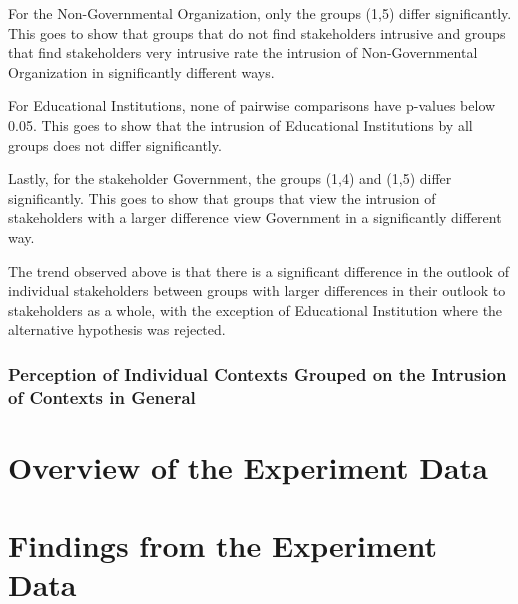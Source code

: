 For the Non-Governmental Organization, only the groups (1,5) differ significantly. This goes to show that groups that do not find stakeholders intrusive and groups that find stakeholders very intrusive rate the intrusion of Non-Governmental Organization in significantly different ways.

For Educational Institutions, none of pairwise comparisons have p-values below 0.05. This goes to show that the intrusion of Educational Institutions by all groups does not differ significantly.

Lastly, for the stakeholder Government, the groups (1,4) and (1,5) differ significantly. This goes to show that groups that view the intrusion of stakeholders with a larger difference view Government in a significantly different way.

The trend observed above is that there is a significant difference in the outlook of individual stakeholders between groups with larger differences
in their outlook to stakeholders as a whole, with the exception of Educational Institution where the alternative hypothesis was rejected.


\subsubsection{Perception of Individual Contexts Grouped on the Intrusion of Contexts in General}



\section{Overview of the Experiment Data}

\section{Findings from the Experiment Data}



